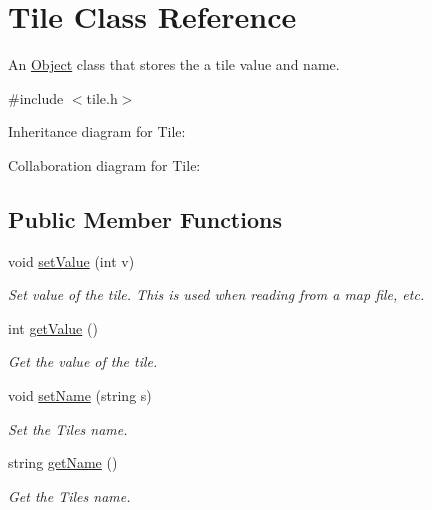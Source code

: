 \hypertarget{classTile}{}\section{Tile Class Reference}
\label{classTile}


An \hyperlink{classObject}{Object} class that stores the a tile value and name.  




{\ttfamily \#include $<$tile.\+h$>$}



Inheritance diagram for Tile\+:


Collaboration diagram for Tile\+:
\subsection*{Public Member Functions}
\begin{DoxyCompactItemize}
\item 
void \hyperlink{classTile_ae3d9e4ace265389dd0e0cf3d62ad6ff3}{set\+Value} (int v)\hypertarget{classTile_ae3d9e4ace265389dd0e0cf3d62ad6ff3}{}\label{classTile_ae3d9e4ace265389dd0e0cf3d62ad6ff3}

\begin{DoxyCompactList}\small\item\em Set value of the tile. This is used when reading from a map file, etc. \end{DoxyCompactList}\item 
int \hyperlink{classTile_aaab3d77d23e378c207ec50e6786052e0}{get\+Value} ()\hypertarget{classTile_aaab3d77d23e378c207ec50e6786052e0}{}\label{classTile_aaab3d77d23e378c207ec50e6786052e0}

\begin{DoxyCompactList}\small\item\em Get the value of the tile. \end{DoxyCompactList}\item 
void \hyperlink{classTile_a03e1a9f0351fcd4d1616bb59f7bd89f3}{set\+Name} (string s)\hypertarget{classTile_a03e1a9f0351fcd4d1616bb59f7bd89f3}{}\label{classTile_a03e1a9f0351fcd4d1616bb59f7bd89f3}

\begin{DoxyCompactList}\small\item\em Set the Tiles name. \end{DoxyCompactList}\item 
string \hyperlink{classTile_a233978090bf0ecbec9aa4d00bb0ac13d}{get\+Name} ()\hypertarget{classTile_a233978090bf0ecbec9aa4d00bb0ac13d}{}\label{classTile_a233978090bf0ecbec9aa4d00bb0ac13d}

\begin{DoxyCompactList}\small\item\em Get the Tiles name. \end{DoxyCompactList}\end{DoxyCompactItemize}


